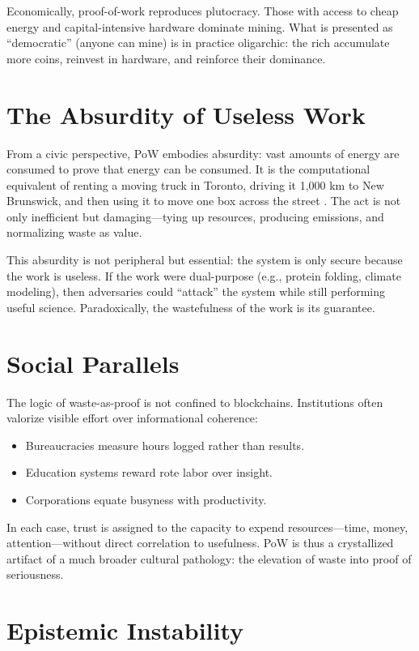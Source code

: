 \documentclass[openany]{book}
\begin{document}
Economically, proof-of-work reproduces plutocracy. Those with access to cheap energy and capital-intensive hardware dominate mining. What is presented as ``democratic'' (anyone can mine) is in practice oligarchic: the rich accumulate more coins, reinvest in hardware, and reinforce their dominance.

\section{The Absurdity of Useless Work}

From a civic perspective, PoW embodies absurdity: vast amounts of energy are consumed to prove that energy can be consumed. It is the computational equivalent of renting a moving truck in Toronto, driving it 1,000 km to New Brunswick, and then using it to move one box across the street \cite{toronto2025}. The act is not only inefficient but damaging---tying up resources, producing emissions, and normalizing waste as value.

This absurdity is not peripheral but essential: the system is only secure because the work is useless. If the work were dual-purpose (e.g., protein folding, climate modeling), then adversaries could ``attack'' the system while still performing useful science. Paradoxically, the wastefulness of the work is its guarantee.

\section{Social Parallels}

The logic of waste-as-proof is not confined to blockchains. Institutions often valorize visible effort over informational coherence:

\begin{itemize}
    \item Bureaucracies measure hours logged rather than results.
    \item Education systems reward rote labor over insight.
    \item Corporations equate busyness with productivity.
\end{itemize}

In each case, trust is assigned to the capacity to expend resources---time, money, attention---without direct correlation to usefulness. PoW is thus a crystallized artifact of a much broader cultural pathology: the elevation of waste into proof of seriousness.

\section{Epistemic Instability}
\end{document}
